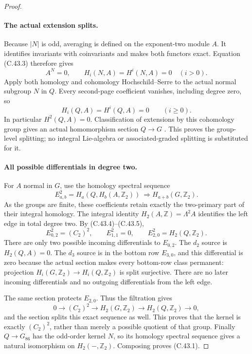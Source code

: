 \begin{proof}
\paragraph{The actual extension splits.}
Because $|N|$ is odd, averaging is defined on the exponent-two
module $A$.  It identifies invariants with coinvariants and makes
both functors exact.  Equation (C.43.3) therefore gives
\[
 A^N=0,\qquad H_i(N,A)=H^i(N,A)=0\quad(i>0).
\]
Apply both homology and cohomology Hochschild--Serre to the actual
normal subgroup $N$ in $Q$.  Every second-page coefficient vanishes,
including degree zero, so
\[
                    H_i(Q,A)=H^i(Q,A)=0\qquad(i\ge0).
 \tag{C.43.5}
\]
In particular $H^2(Q,A)=0$.  Classification of extensions by this
cohomology group gives an actual homomorphism section $Q\to G$
\cite[II, Example~1.18(b), Remark~1.35(b)]{PBC_MilneCFT}.
This proves the group-level splitting; no integral Lie-algebra or
associated-graded splitting is substituted for it.

\paragraph{All possible differentials in degree two.}
For $A$ normal in $G$, use the homology spectral sequence
\[
 E^2_{a,b}=H_a(Q,H_b(A,\mathbb Z_2))
                              \ \Longrightarrow H_{a+b}(G,\mathbb Z_2).
 \tag{C.43.6}
\]
As the groups are finite, these coefficients retain exactly the
two-primary part of their integral homology.  The integral identity
$H_2(A,\mathbb Z)=\Lambda^2A$ identifies the left edge in total
degree two.  By (C.43.4)--(C.43.5),
\[
 E^2_{0,2}=(C_2)^2,\qquad E^2_{1,1}=0,\qquad
                         E^2_{2,0}=H_2(Q,\mathbb Z_2).
 \tag{C.43.7}
\]
There are only two possible incoming differentials to $E_{0,2}$.
The $d_2$ source is $H_2(Q,A)=0$.  The $d_3$ source is in the
bottom row $E_{3,0}$, and this differential is zero because the
actual section makes every bottom-row class permanent: projection
$H_i(G,\mathbb Z_2)\to H_i(Q,\mathbb Z_2)$ is split surjective.
There are no later incoming differentials and no outgoing
differentials from the left edge.

The same section protects $E_{2,0}$.  Thus the filtration gives
\[
 0\longrightarrow(C_2)^2\longrightarrow H_2(G,\mathbb Z_2)
        \longrightarrow H_2(Q,\mathbb Z_2)\longrightarrow0,
\]
and the section splits this exact sequence as well.  This proves
that the kernel is exactly $(C_2)^2$, rather than merely a possible
quotient of that group.  Finally $Q\to G_{86}$ has the odd-order
kernel $N$, so its homology spectral sequence gives a natural
isomorphism on $H_2(-,\mathbb Z_2)$.  Composing proves (C.43.1).


\end{proof}

